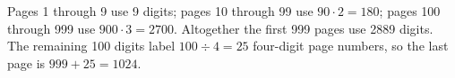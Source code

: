 Pages 1 through 9 use 9 digits; pages 10 through 99 use $ 90\cdot2=180 $; pages 100 through 999 use $ 900\cdot3=2700 $. Altogether the first 999 pages use 2889 digits. The remaining 100 digits label $ 100\div4=25 $ four-digit page numbers, so the last page is $ 999+25=\boxed{1024}$.
